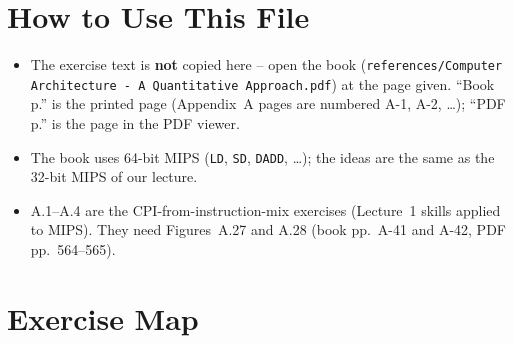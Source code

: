 \documentclass[11pt]{article}
\begin{document}
\sloppy
{}

\section{How to Use This File}

\begin{itemize}[leftmargin=*]
  \item The exercise text is \textbf{not} copied here -- open the book
  (\texttt{references/Computer Architecture - A Quantitative Approach.pdf})
  at the page given. ``Book p.'' is the printed page (Appendix~A pages are
  numbered A-1, A-2, \dots); ``PDF p.'' is the page in the PDF viewer.
  \item The book uses 64-bit MIPS (\texttt{LD}, \texttt{SD}, \texttt{DADD},
  \dots); the ideas are the same as the 32-bit MIPS of our lecture.
  \item A.1--A.4 are the CPI-from-instruction-mix exercises (Lecture~1
  skills applied to MIPS). They need Figures~A.27 and A.28 (book pp.~A-41 and
  A-42, PDF pp.~564--565).
\end{itemize}

\section{Exercise Map}
\end{document}
